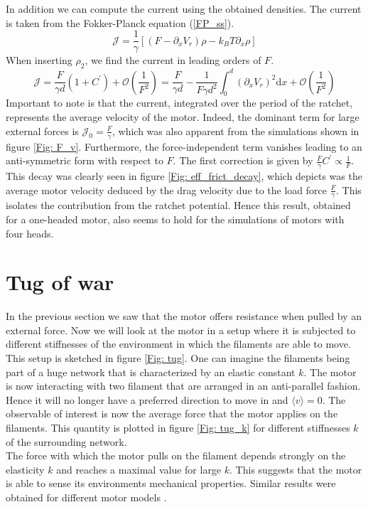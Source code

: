 \documentclass[aps,pre,onecolumn,showpacs,showkeys,a4paper]{revtex4}
\newcommand{\rmd}{{\mathrm d}}
\begin{document}
\par
In addition we can compute the current using the obtained densities. 
The current is taken from the Fokker-Planck equation (\ref{FP_ss}).
\begin{equation}
\mathcal{J} = \frac{1}{\gamma}\left[\left(F - \partial_x V_r\right)\rho - k_BT\partial_x\rho\right] 
\end{equation}
When inserting $\rho_2$, we find the current in leading orders of $F$.
\begin{equation}
\mathcal{J} = \frac{F}{\gamma d}\left(1+C^\prime\right)  +  \mathcal{O}(\frac{1}{F^2}) = \frac{F}{\gamma d} - \frac{1}{F\gamma d^2}\int^d_0\left(\partial_x V_r\right)^2 \rmd x + \mathcal{O}(\frac{1}{F^2}) 
\end{equation}
Important to note is that the current, integrated over the period of the ratchet, represents the average velocity of the motor. 
Indeed, the dominant term for large external forces is $\mathcal{J}_0 = \frac{F}{\gamma}$, which was also apparent from the simulations shown in figure \ref{Fig: F_v}. 
Furthermore, the force-independent term vanishes leading to an anti-symmetric form with respect to $F$. 
The first correction is given by $\frac{F}{\gamma}C^\prime\propto \frac{1}{F}$. 
This decay was clearly seen in figure \ref{Fig: eff_frict_decay}, which depicts was the average motor velocity deduced by the drag velocity due to the load force $\frac{F}{\gamma}$. 
This isolates the contribution from the ratchet potential. 
Hence this result, obtained for a one-headed motor, also seems to hold for the simulations of motors with four heads. 



\section{Tug of war}
In the previous section we saw that the motor offers resistance when pulled by an external force. 
Now we will look at the motor in a setup where it is subjected to different stiffnesses of the environment in which the filaments are able to move. 
This setup is sketched in figure \ref{Fig: tug}. 
One can imagine the filaments being part of a huge network that is characterized by an elastic constant $k$. 
The motor is now interacting with two filament that are arranged in an anti-parallel fashion. 
Hence it will no longer have a preferred direction to move in and $\langle v\rangle=0$. 
The observable of interest is now the average force that the motor applies on the filaments. 
This quantity is plotted in figure \ref{Fig: tug_k} for different stiffnesses $k$ of the surrounding network. \\
The force with which the motor pulls on the filament depends strongly on the elasticity $k$ and reaches a maximal value for large $k$. 
This suggests that the motor is able to sense its environments mechanical properties. 
Similar results were obtained for different motor models \cite{stam2015isoforms,albert2014stochastic}.
\end{document}
